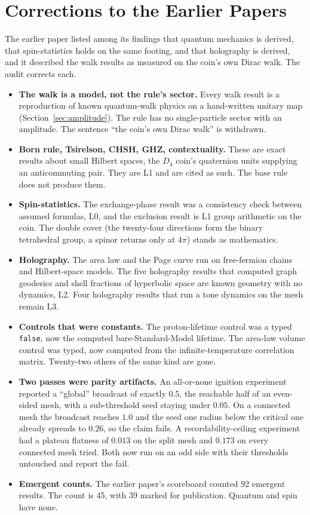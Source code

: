 \section{Corrections to the Earlier Papers}
\label{sec:corrections}

The earlier paper \cite{pollard2026discrete} listed among its findings that quantum mechanics is derived, that
spin-statistics holds on the same footing, and that holography is derived, and it described the walk results as
measured on the coin's own Dirac walk. The audit corrects each.

\begin{itemize}
\item \textbf{The walk is a model, not the rule's sector.} Every walk result is a reproduction of known quantum-walk
physics on a hand-written unitary map (Section~\ref{sec:amplitude}). The rule has no single-particle sector with an
amplitude. The sentence ``the coin's own Dirac walk'' is withdrawn.
\item \textbf{Born rule, Tsirelson, CHSH, GHZ, contextuality.} These are exact results about small Hilbert spaces,
the $D_4$ coin's quaternion units supplying an anticommuting pair. They are L1 and are cited as such. The base rule
does not produce them.
\item \textbf{Spin-statistics.} The exchange-phase result was a consistency check between assumed formulas, L0, and
the exclusion result is L1 group arithmetic on the coin. The double cover (the twenty-four directions form the binary
tetrahedral group, a spinor returns only at $4\pi$) stands as mathematics.
\item \textbf{Holography.} The area law and the Page curve run on free-fermion chains and Hilbert-space models. The
five holography results that computed graph geodesics and shell fractions of hyperbolic space are known geometry
with no dynamics, L2. Four holography results that run a tone dynamics on the mesh remain L3.
\item \textbf{Controls that were constants.} The proton-lifetime control was a typed \texttt{false}, now the computed
bare-Standard-Model lifetime. The area-law volume control was typed, now computed from the infinite-temperature
correlation matrix. Twenty-two others of the same kind are gone.
\item \textbf{Two passes were parity artifacts.} An all-or-none ignition experiment reported a ``global'' broadcast
of exactly $0.5$, the reachable half of an even-sided mesh, with a sub-threshold seed staying under $0.05$. On a
connected mesh the broadcast reaches $1.0$ and the seed one radius below the critical one already spreads to $0.26$,
so the claim fails. A recordability-ceiling experiment had a plateau flatness of $0.013$ on the split mesh and
$0.173$ on every connected mesh tried. Both now run on an odd side with their thresholds untouched and report the
fail.
\item \textbf{Emergent counts.} The earlier paper's scoreboard counted 92 emergent results. The count is 45, with
39 marked for publication. Quantum and spin have none.
\end{itemize}

